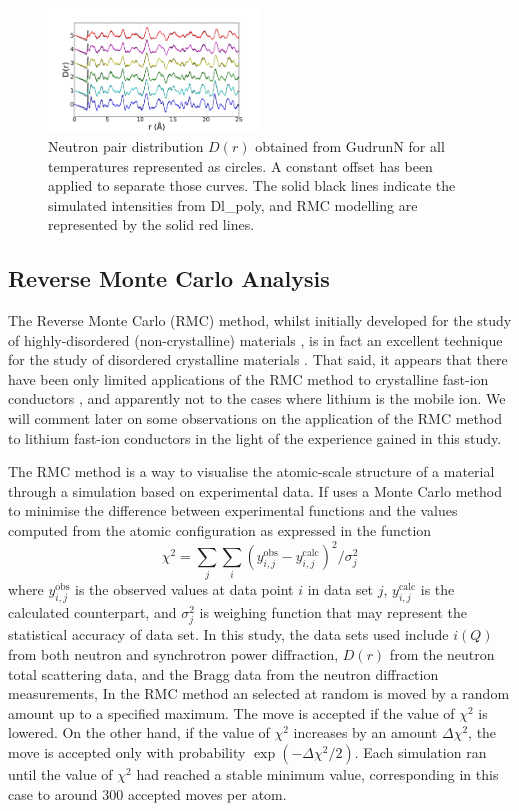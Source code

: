 \documentclass[twoside,twocolumn,9pt]{article}
\begin{document}
\begin{figure}[t]
\centering
\includegraphics[width=0.5\textwidth]{Pics/npdf.pdf}
\caption{Neutron pair distribution $D(r)$  obtained from GudrunN for all temperatures represented as circles.
 A constant offset has been applied to separate those curves.
 The solid black lines indicate the  simulated intensities from Dl\_poly, and RMC modelling are represented by the solid red lines. }
\label{fig:npdf}
\end{figure}

\subsection{Reverse Monte Carlo Analysis}

The Reverse Monte Carlo (RMC) method, whilst initially developed for the study of highly-disordered (non-crystalline) materials \cite{McGreevy:1988bu}, is in fact an excellent technique for the study of disordered crystalline materials \cite{Keen:2005dd}. That said, it appears that there have been only limited applications of the RMC method to crystalline fast-ion conductors \cite{Adams:2000ez, Swenson:2001if, Adams:2002ga,Adams:2005ds}, and apparently not to the cases where lithium is the mobile ion. We will comment later on some observations on the application of the RMC method to lithium fast-ion conductors in the light of the experience gained in this study.

The RMC method is a way to visualise the atomic-scale structure of a material through a simulation based on experimental data. If uses a Monte Carlo method to minimise the difference between experimental functions and the values computed from the atomic configuration as expressed in the function
\begin{equation}
\chi^2=\sum_{j}\sum_{i}(y^ \mathrm{obs}_{i,j}-y^ \mathrm{calc}_{i,j})^2/\sigma^2_{j}
\end{equation}
where $y^\mathrm{obs}_{i,j}$ is the observed values at data point $i$ in data set $j$, $y^ \mathrm{calc}_{i,j}$ is the calculated counterpart, and  $\sigma^2_{j}$ is weighing function that may represent the statistical accuracy of data set. In this study, the data sets used include $i(Q)$ from both neutron and  synchrotron power diffraction, $D(r)$ from the neutron total scattering data, and the Bragg data from the neutron diffraction measurements, In the RMC method an selected at random is moved by a random amount up to a specified maximum. The move is accepted if the value of $\chi^2$ is lowered. On the other hand, if the value of $\chi^2$ increases by an amount $\Delta \chi^2$, the move is accepted only with probability $\exp(-\Delta \chi^2/2)$. Each simulation ran until the value of $\chi^2$ had reached a stable minimum value, corresponding in this case to around 300 accepted moves per atom.
\end{document}
